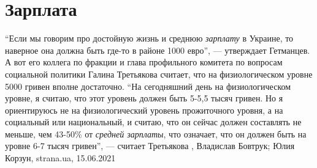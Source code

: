  
 
 
 
 
\chapter{Зарплата}
\label{sec:slova.zarplata}

\enquote{Если мы говорим про достойную жизнь и среднюю \emph{зарплату} в Украине, то
наверное она должна быть где-то в районе 1000 евро}, — утверждает Гетманцев.  А
вот его коллега по фракции и глава профильного комитета по вопросам социальной
политики Галина Третьякова считает, что на физиологическом уровне 5000 гривен
вполне достаточно.  \enquote{На сегодняшний день на физиологическом уровне, я
считаю, что этот уровень должен быть 5-5,5 тысяч гривен. Но я ориентируюсь не
на физиологический уровень прожиточного уровня, а на социальный или
национальный, и считаю, что он сейчас должен составлять не меньше, чем 43-50\%
от \emph{средней зарплаты}, что означает, что он должен быть на уровне 6-7 тысяч
гривен}, — считает Третьякова
, 
Владислав Бовтрук; Юлия Корзун, strana.ua, 15.06.2021

